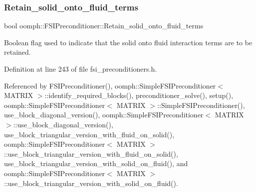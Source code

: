\mbox{\label{classoomph_1_1FSIPreconditioner_acecba46494b0aa6f2035020f53be634c}} 
\subsubsection{\texorpdfstring{Retain\+\_\+solid\+\_\+onto\+\_\+fluid\+\_\+terms}{Retain\_solid\_onto\_fluid\_terms}}
{\footnotesize\ttfamily bool oomph\+::\+F\+S\+I\+Preconditioner\+::\+Retain\+\_\+solid\+\_\+onto\+\_\+fluid\+\_\+terms\hspace{0.3cm}{\ttfamily [private]}}



Boolean flag used to indicate that the solid onto fluid interaction terms are to be retained. 



Definition at line 243 of file fsi\+\_\+preconditioners.\+h.



Referenced by F\+S\+I\+Preconditioner(), oomph\+::\+Simple\+F\+S\+I\+Preconditioner$<$ M\+A\+T\+R\+I\+X $>$\+::identify\+\_\+required\+\_\+blocks(), preconditioner\+\_\+solve(), setup(), oomph\+::\+Simple\+F\+S\+I\+Preconditioner$<$ M\+A\+T\+R\+I\+X $>$\+::\+Simple\+F\+S\+I\+Preconditioner(), use\+\_\+block\+\_\+diagonal\+\_\+version(), oomph\+::\+Simple\+F\+S\+I\+Preconditioner$<$ M\+A\+T\+R\+I\+X $>$\+::use\+\_\+block\+\_\+diagonal\+\_\+version(), use\+\_\+block\+\_\+triangular\+\_\+version\+\_\+with\+\_\+fluid\+\_\+on\+\_\+solid(), oomph\+::\+Simple\+F\+S\+I\+Preconditioner$<$ M\+A\+T\+R\+I\+X $>$\+::use\+\_\+block\+\_\+triangular\+\_\+version\+\_\+with\+\_\+fluid\+\_\+on\+\_\+solid(), use\+\_\+block\+\_\+triangular\+\_\+version\+\_\+with\+\_\+solid\+\_\+on\+\_\+fluid(), and oomph\+::\+Simple\+F\+S\+I\+Preconditioner$<$ M\+A\+T\+R\+I\+X $>$\+::use\+\_\+block\+\_\+triangular\+\_\+version\+\_\+with\+\_\+solid\+\_\+on\+\_\+fluid().

\mbox{\label{classoomph_1_1FSIPreconditioner_a9a6616d03bd67e2c1c406bcb6d332893}} 
